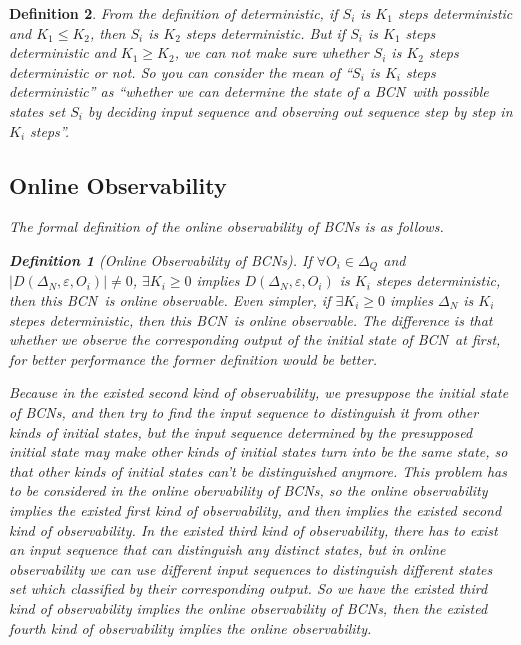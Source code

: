 \documentclass[conference]{IEEEtran} %
\newtheorem{definition}{Definition}
\def \BCN {{\em BCN}}
\begin{document}
\begin{definition}
From the definition of deterministic, if $S_i$ is $K_1$ steps deterministic and $K_1\leq K_2$, then $S_i$ is $K_2$ steps deterministic. But if $S_i$ is $K_1$ steps deterministic and $K_1\geq K_2$, we can not make sure whether $S_i$ is $K_2$ steps deterministic or not. So you can consider the mean of ``$S_i$ is $K_i$ steps deterministic'' as ``whether we can determine the state of a \BCN\ with possible states set $S_i$ by deciding input sequence and observing out sequence step by step in $K_i$ steps''.
\subsection{Online Observability}
The formal definition of the online observability of {\em BCNs} is as follows.
\begin{definition}[Online Observability of  BCNs]
If $\forall  O_i\in \Delta_Q$ and $|D\left(\Delta_N,\varepsilon, O_i\right)|\neq 0$, $\exists K_i \ge 0$ implies $D\left(\Delta_N,\varepsilon,O_i\right)$ is $K_i$ stepes deterministic, then this \BCN\ is online observable. Even simpler, if $\exists K_i \ge 0$ implies $\Delta_N$ is $K_i$ stepes deterministic, then this \BCN\ is online observable. The difference is that whether we observe the corresponding output of the initial state of \BCN\ at first, for better performance the former definition would be better.
\end{definition}

Because in the existed second kind of observability, we presuppose the initial state of {\em BCNs}, and then try to find the input sequence to distinguish it from other kinds of initial states, but the input sequence determined by the presupposed initial state may make other kinds of initial states turn into be the same state, so that other kinds of initial states can't be distinguished anymore. This problem has to be considered in the online obervability of {\em BCNs}, so the online observability implies the existed first kind of observability, and then implies the existed second kind of observability. In the existed third kind of observability, there has to exist an input sequence that can distinguish any distinct states, but in online observability we can use different input sequences to distinguish different states set which classified by their corresponding output. So we have the existed third kind of observability implies the online observability of {\em BCNs}, then the existed fourth kind of observability implies the online observability.


\end{definition}
\end{document}
